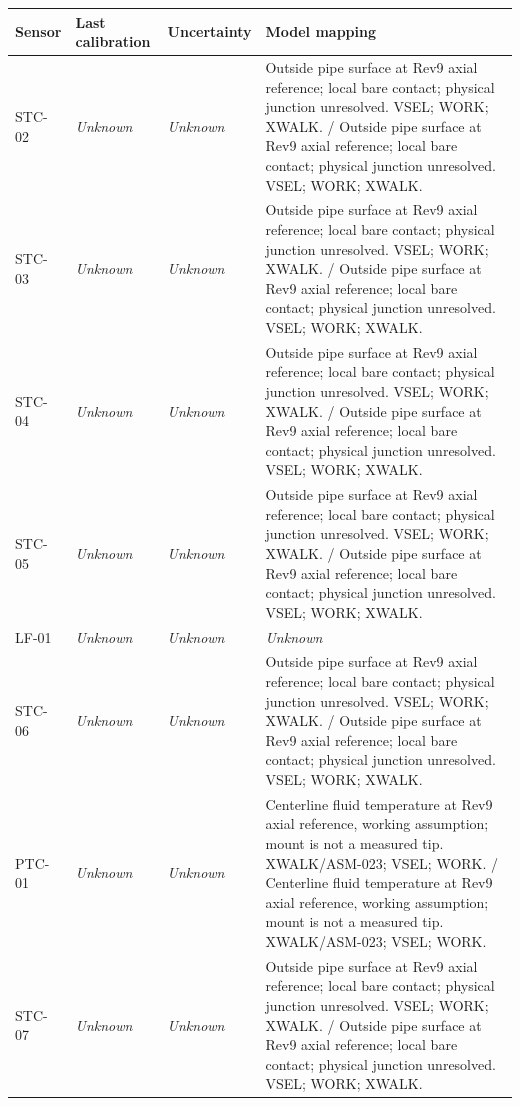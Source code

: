\documentclass[11pt]{article}
\begin{document}
\begin{longtable}{>{\raggedright\arraybackslash}p{}>{\raggedright\arraybackslash}p{}>{\raggedright\arraybackslash}p{}>{\raggedright\arraybackslash}p{}}
\toprule
\textbf{Sensor} & \textbf{Last calibration} & \textbf{Uncertainty} & \textbf{Model mapping} \\\midrule\endhead
STC-02 & \textit{Unknown} & \textit{Unknown} & Outside pipe surface at Rev9 axial reference; local bare contact; physical junction unresolved. VSEL; WORK; XWALK. / Outside pipe surface at Rev9 axial reference; local bare contact; physical junction unresolved. VSEL; WORK; XWALK. \\[3pt]
STC-03 & \textit{Unknown} & \textit{Unknown} & Outside pipe surface at Rev9 axial reference; local bare contact; physical junction unresolved. VSEL; WORK; XWALK. / Outside pipe surface at Rev9 axial reference; local bare contact; physical junction unresolved. VSEL; WORK; XWALK. \\[3pt]
STC-04 & \textit{Unknown} & \textit{Unknown} & Outside pipe surface at Rev9 axial reference; local bare contact; physical junction unresolved. VSEL; WORK; XWALK. / Outside pipe surface at Rev9 axial reference; local bare contact; physical junction unresolved. VSEL; WORK; XWALK. \\[3pt]
STC-05 & \textit{Unknown} & \textit{Unknown} & Outside pipe surface at Rev9 axial reference; local bare contact; physical junction unresolved. VSEL; WORK; XWALK. / Outside pipe surface at Rev9 axial reference; local bare contact; physical junction unresolved. VSEL; WORK; XWALK. \\[3pt]
LF-01 & \textit{Unknown} & \textit{Unknown} & \textit{Unknown} \\[3pt]
STC-06 & \textit{Unknown} & \textit{Unknown} & Outside pipe surface at Rev9 axial reference; local bare contact; physical junction unresolved. VSEL; WORK; XWALK. / Outside pipe surface at Rev9 axial reference; local bare contact; physical junction unresolved. VSEL; WORK; XWALK. \\[3pt]
PTC-01 & \textit{Unknown} & \textit{Unknown} & Centerline fluid temperature at Rev9 axial reference, working assumption; mount is not a measured tip. XWALK/ASM-023; VSEL; WORK. / Centerline fluid temperature at Rev9 axial reference, working assumption; mount is not a measured tip. XWALK/ASM-023; VSEL; WORK. \\[3pt]
STC-07 & \textit{Unknown} & \textit{Unknown} & Outside pipe surface at Rev9 axial reference; local bare contact; physical junction unresolved. VSEL; WORK; XWALK. / Outside pipe surface at Rev9 axial reference; local bare contact; physical junction unresolved. VSEL; WORK; XWALK. \\[3pt]

\end{longtable}
\end{document}
